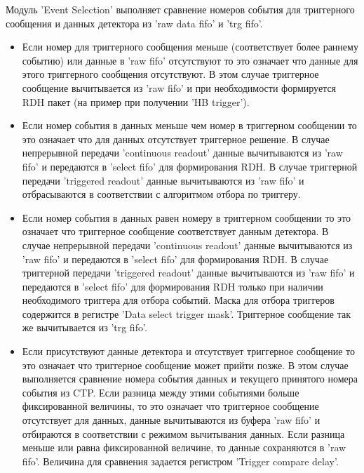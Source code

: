 \documentclass{article}
\begin{document}
Модуль 'Event Selection' выполняет сравнение номеров события для триггерного сообщения и данных детектора из 'raw data fifo' и 'trg fifo'.
\begin{itemize}
\item Если номер для триггерного сообщения меньше (соответствует более раннему событию) или данные в 'raw fifo' отсутствуют то это означает что данные для этого триггерного сообщения отсутствуют. В этом случае триггерное сообщение вычитывается из 'raw fifo' и при необходимости формируется RDH пакет (на пример при получении 'HB trigger').

\item Если номер события в данных меньше чем номер в триггерном сообщении то это означает что для данных отсутствует триггерное решение. В случае непрерывной передачи 'continuous readout' данные вычитываются из 'raw fifo' и передаются в 'select fifo' для формирования RDH. В случае триггерной передачи 'triggered readout' данные вычитываются из 'raw fifo' и отбрасываются в соответствии с алгоритмом отбора по триггеру.

\item Если номер события в данных равен номеру в триггерном сообщении то это означает что триггерное сообщение соответствует данным детектора. В случае непрерывной передачи 'continuous readout' данные вычитываются из 'raw fifo' и передаются в 'select fifo' для формирования RDH. В случае триггерной передачи 'triggered readout' данные вычитываются из 'raw fifo' и передаются в 'select fifo' для формирования RDH только при наличии необходимого триггера для отбора событий. Маска для отбора триггеров содержится в регистре 'Data select trigger mask'. Триггерное сообщение так же вычитывается из 'trg fifo'.

\item Если присутствуют данные детектора и отсутствует триггерное сообщение то это означает что триггерное сообщение может прийти позже. В этом случае выполняется сравнение номера события данных и текущего принятого номера события из CTP. Если разница между этими событиями больше фиксированной величины, то это означает что триггерное сообщение отсутствует для данных, данные вычитываются из буфера 'raw fifo' и отбираются в соответствии с режимом вычитывания данных. Если разница меньше или равна фиксированной величине, то данные сохраняются в 'raw fifo'. Величина для сравнения задается регистром 'Trigger compare delay'.
\end{itemize}
\end{document}
